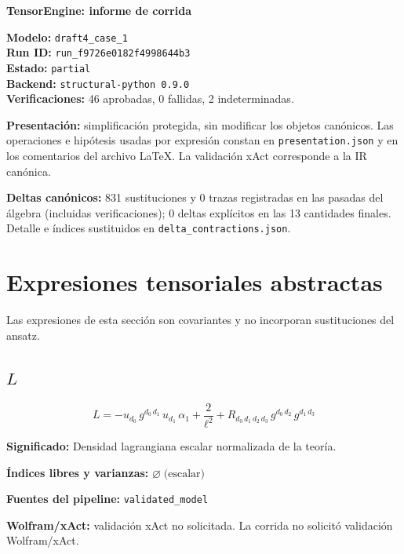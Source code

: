 \documentclass[11pt]{article}
\begin{document}
\begin{center}
{\Large\bfseries TensorEngine: informe de corrida}
\end{center}
\textbf{Modelo:} \texttt{draft4\_case\_1}\\
\textbf{Run ID:} \texttt{run\_f9726e0182f4998644b3}\\
\textbf{Estado:} \texttt{partial}\\
\textbf{Backend:} \texttt{structural-python 0.9.0}\\
\textbf{Verificaciones:} 46 aprobadas, 0 fallidas, 2 indeterminadas.
\par\smallskip
\textbf{Presentación:} simplificación protegida, sin modificar los objetos canónicos. Las operaciones e hipótesis usadas por expresión constan en \texttt{presentation.json} y en los comentarios del archivo LaTeX. La validación xAct corresponde a la IR canónica.\par
\textbf{Deltas canónicos:} 831 sustituciones y 0 trazas registradas en las pasadas del álgebra (incluidas verificaciones); 0 deltas explícitos en las 13 cantidades finales. Detalle e índices sustituidos en \texttt{delta\_contractions.json}.\par
\section*{Expresiones tensoriales abstractas}
Las expresiones de esta sección son covariantes y no incorporan sustituciones del ansatz.
\subsection*{$ L $}
\begin{dmath*}[breakdepth={5}]
L = -u{}_{d_{0}}\,g{}^{d_{0}\,d_{1}}\,u{}_{d_{1}}\,\alpha_{1} + \frac{2}{{\ell}^{2}} + R{}_{d_{0}\,d_{1}\,d_{2}\,d_{3}}\,g{}^{d_{0}\,d_{2}}\,g{}^{d_{1}\,d_{3}}
\end{dmath*}
\par\vspace{1.2\baselineskip}\noindent
\begin{minipage}{\linewidth}
\textbf{Significado:} Densidad lagrangiana escalar normalizada de la teoría.\par
\textbf{Índices libres y varianzas:} $ \varnothing\;\text{(escalar)} $\par
\textbf{Fuentes del pipeline:} \texttt{validated\_model}\par
\textbf{Wolfram/xAct:} validación xAct no solicitada. La corrida no solicitó validación Wolfram/xAct.\par
\end{minipage}
\end{document}
